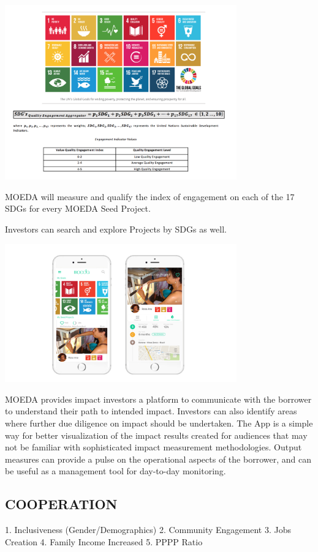 \documentclass{article}
\begin{document}
\includegraphics[width=10cm,keepaspectratio]{sdgs}

MOEDA will measure and qualify the index of engagement on each of the 17 SDGs for every MOEDA Seed Project. 

Investors can search and explore Projects by SDGs as well.

\includegraphics[width=10cm,keepaspectratio]{projects}

MOEDA provides impact investors a platform to communicate with the borrower to understand their path to intended impact. Investors can also identify areas where further due diligence on impact should be undertaken. The App is a simple way for better visualization of the impact results created for audiences that may not be familiar with sophisticated impact measurement methodologies. Output measures can provide a pulse on the operational aspects of the borrower, and can be useful as a management tool for day-to-day monitoring. 


\subsection {COOPERATION}

1.	Inclusiveness (Gender/Demographics) 
2.	Community Engagement 
3.	Jobs Creation
4.	Family Income Increased 
5.	PPPP Ratio
\end{document}
